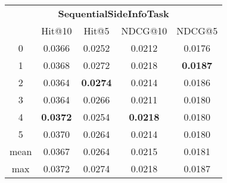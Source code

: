\documentclass{article}
\begin{document}
 

\begin{tabular}{c|cccc}

\multicolumn{5}{c}{\textbf{SequentialSideInfoTask}} \\
\noalign{\smallskip}
\noalign{\smallskip}
\toprule
\multicolumn{1}{c}{Template ID} & \multicolumn{1}{|c}{Hit@10} & \multicolumn{1}{c}{Hit@5} & \multicolumn{1}{c}{NDCG@10} & \multicolumn{1}{c}{NDCG@5} \\
\midrule
0 & 0.0366 & 0.0252 & 0.0212 & 0.0176 \\
1 & 0.0368 & 0.0272 & 0.0218 & \textbf{0.0187} \\
2 & 0.0364 & \textbf{0.0274} & 0.0214 & 0.0186 \\
3 & 0.0364 & 0.0266 & 0.0211 & 0.0180 \\
4 & \textbf{0.0372} & 0.0254 & \textbf{0.0218} & 0.0180 \\
5 & 0.0370 & 0.0264 & 0.0214 & 0.0180 \\
\midrule
mean & 0.0367 & 0.0264 & 0.0215 & 0.0181 \\
max & 0.0372 & 0.0274 & 0.0218 & 0.0187 \\
\bottomrule

\end{tabular}
\end{document}
